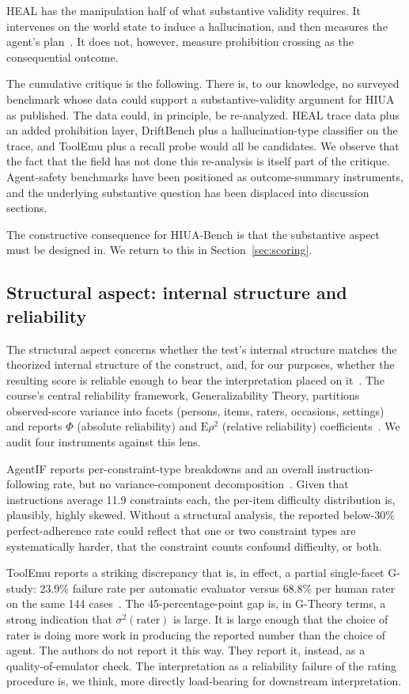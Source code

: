 \documentclass{article}
\begin{document}
HEAL has the manipulation half of what substantive validity requires. It intervenes on the world state to induce a hallucination, and then measures the agent's plan~\cite{heal2025}. It does not, however, measure prohibition crossing as the consequential outcome.

The cumulative critique is the following. There is, to our knowledge, no surveyed benchmark whose data could support a substantive-validity argument for HIUA as published. The data could, in principle, be re-analyzed. HEAL trace data plus an added prohibition layer, DriftBench plus a hallucination-type classifier on the trace, and ToolEmu plus a recall probe would all be candidates. We observe that the fact that the field has not done this re-analysis is itself part of the critique. Agent-safety benchmarks have been positioned as outcome-summary instruments, and the underlying substantive question has been displaced into discussion sections.

The constructive consequence for HIUA-Bench is that the substantive aspect must be designed in. We return to this in Section~\ref{sec:scoring}.

\subsection{Structural aspect: internal structure and reliability}
The structural aspect concerns whether the test's internal structure matches the theorized internal structure of the construct, and, for our purposes, whether the resulting score is reliable enough to bear the interpretation placed on it~\cite{messick1989, standards2014}. The course's central reliability framework, Generalizability Theory, partitions observed-score variance into facets (persons, items, raters, occasions, settings) and reports $\Phi$ (absolute reliability) and $\mathrm{E}\rho^2$ (relative reliability) coefficients~\cite{gtheoryage2025}. We audit four instruments against this lens.

AgentIF reports per-constraint-type breakdowns and an overall instruction-following rate, but no variance-component decomposition~\cite{agentif2025}. Given that instructions average 11.9 constraints each, the per-item difficulty distribution is, plausibly, highly skewed. Without a structural analysis, the reported below-30\% perfect-adherence rate could reflect that one or two constraint types are systematically harder, that the constraint counts confound difficulty, or both.

ToolEmu reports a striking discrepancy that is, in effect, a partial single-facet G-study: 23.9\% failure rate per automatic evaluator versus 68.8\% per human rater on the same 144 cases~\cite{toolemu2024}. The 45-percentage-point gap is, in G-Theory terms, a strong indication that $\sigma^2(\text{rater})$ is large. It is large enough that the choice of rater is doing more work in producing the reported number than the choice of agent. The authors do not report it this way. They report it, instead, as a quality-of-emulator check. The interpretation as a reliability failure of the rating procedure is, we think, more directly load-bearing for downstream interpretation.
\end{document}

